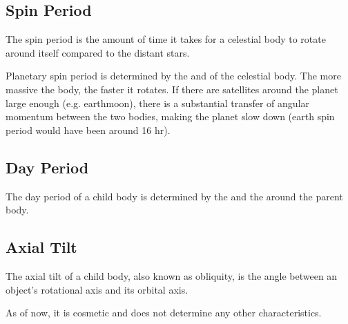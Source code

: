 \documentclass[letterpaper,10pt,english]{sphinxmanual}
\begin{document}
\subsection{Spin Period}
\label{\detokenize{quantities/rotational/spin_period:spin-period}}\label{\detokenize{quantities/rotational/spin_period::doc}}\label{\detokenize{quantities/rotational/spin_period:id1}}
\sphinxAtStartPar
The spin period is the amount of time it takes for a celestial body to
rotate around itself compared to the distant stars.

\sphinxAtStartPar
Planetary spin period is determined by the {\hyperref[\detokenize{quantities/material/mass:id1}]{}} and {\hyperref[\detokenize{quantities/geometric/radius:id1}]{}} of the celestial body.
The more massive the body, the faster it rotates.
If there are satellites around the planet large enough
(e.g. earth\sphinxhyphen{}moon), there is a substantial transfer of
angular momentum between the two bodies, making the planet
slow down (earth spin period would have been around 16 hr).


\subsection{Day Period}
\label{\detokenize{quantities/rotational/day_period:day-period}}\label{\detokenize{quantities/rotational/day_period::doc}}\label{\detokenize{quantities/rotational/day_period:id1}}
\sphinxAtStartPar
The day period of a child body is determined by the {\hyperref[\detokenize{quantities/rotational/spin_period:id1}]{}}
and the {\hyperref[\detokenize{quantities/orbital/orbital_period:id1}]{}} around the parent body.


\subsection{Axial Tilt}
\label{\detokenize{quantities/rotational/axial_tilt:axial-tilt}}\label{\detokenize{quantities/rotational/axial_tilt::doc}}\label{\detokenize{quantities/rotational/axial_tilt:id1}}
\sphinxAtStartPar
The axial tilt of a child body, also known as obliquity, is
the angle between an object’s rotational axis and its orbital axis.

\sphinxAtStartPar
As of now, it is cosmetic and does not determine any other characteristics.
\end{document}
